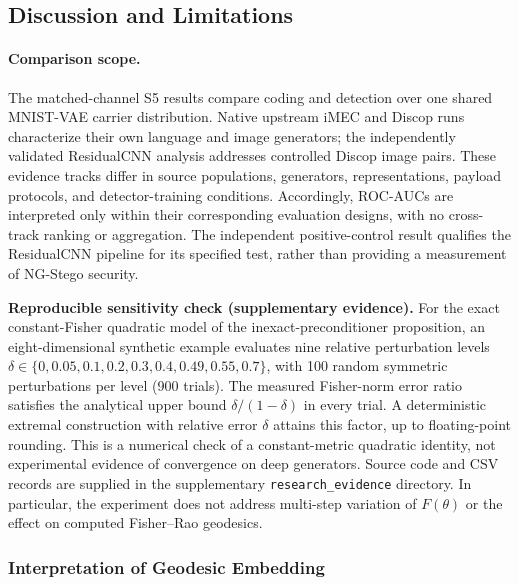 \documentclass[a4paper,fleqn]{cas-dc}
\begin{document}
\subsection{Discussion and Limitations}
\label{sec:discussion}

\paragraph{Comparison scope.}
The matched-channel S5 results compare coding and detection over one shared
MNIST-VAE carrier distribution. Native upstream iMEC and Discop runs
characterize their own language and image generators; the independently
validated ResidualCNN analysis addresses controlled Discop image pairs.
These evidence tracks differ in source populations, generators, representations,
payload protocols, and detector-training conditions. Accordingly, ROC-AUCs
are interpreted only within their corresponding evaluation designs, with no
cross-track ranking or aggregation. The independent positive-control result
qualifies the ResidualCNN pipeline for its specified test, rather than
providing a measurement of NG-Stego security.


\noindent\textbf{Reproducible sensitivity check (supplementary evidence).}
For the exact constant-Fisher quadratic model of the inexact-preconditioner
proposition, an eight-dimensional synthetic example evaluates nine relative
perturbation levels $\delta\in\{0,0.05,0.1,0.2,0.3,0.4,0.49,0.55,0.7\}$,
with 100 random symmetric perturbations per level (900 trials). The
measured Fisher-norm error ratio satisfies the analytical upper bound
$\delta/(1-\delta)$ in every trial. A deterministic extremal construction
with relative error $\delta$ attains this factor, up to floating-point
rounding. This is a numerical check of a constant-metric quadratic
identity, not experimental evidence of convergence on deep generators.
Source code and CSV records are supplied in the supplementary
\texttt{research\_evidence} directory. In particular, the experiment
does not address multi-step variation of $F(\theta)$ or the effect on
computed Fisher--Rao geodesics.

\subsubsection{Interpretation of Geodesic Embedding}
\end{document}

